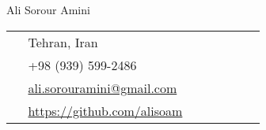 \begin{paracol}{2}
  \parbox[top][0.12\textheight][c]{\linewidth}
  {
    \vspace{-0.04\textheight}
    \centering
    {\sffamily\Huge Ali Sorour Amini}
  }
  \switchcolumn
  \parbox[top][0.12\textheight][c]{\linewidth}
  {
    \vspace{-0.04\textheight}
    \colorbox{shade}
    {
      \begin{supertabular}{p{0.05\linewidth}|p{0.775\linewidth}}
        \raisebox{-1pt}{\faHome} & Tehran, Iran\\
        \raisebox{-1pt}{\faPhone} & +98 (939) 599-2486 \\
        \raisebox{0pt}{\small\faEnvelope} & \href{mailto:ali.sorouramini@gmail.com}{ali.sorouramini@gmail.com} \\
        \raisebox{-1pt}{\faGithub} & \href{https://github.com/AliSoAm}{https://github.com/alisoam} \\
      \end{supertabular}
    }
  }
\end{paracol}
